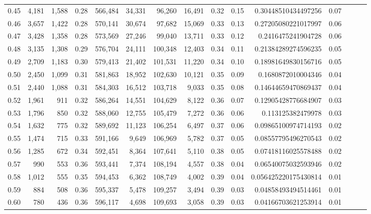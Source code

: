 \begin{tabular}{rrrrrrrrrrrrrrr}
0.45 &   4,181 &  1,588 &  0.28 &  566,484 &   34,331 &   96,260 &   16,491 &  0.32 &  0.15 &     0.30448510434497256 &      0.07 \\
0.46 &   3,657 &  1,422 &  0.28 &  570,141 &   30,674 &   97,682 &   15,069 &  0.33 &  0.13 &     0.27205080221017997 &      0.06 \\
0.47 &   3,428 &  1,358 &  0.28 &  573,569 &   27,246 &   99,040 &   13,711 &  0.33 &  0.12 &      0.2416475241904728 &      0.06 \\
0.48 &   3,135 &  1,308 &  0.29 &  576,704 &   24,111 &  100,348 &   12,403 &  0.34 &  0.11 &     0.21384289274596235 &      0.05 \\
0.49 &   2,709 &  1,183 &  0.30 &  579,413 &   21,402 &  101,531 &   11,220 &  0.34 &  0.10 &     0.18981649830156716 &      0.05 \\
0.50 &   2,450 &  1,099 &  0.31 &  581,863 &   18,952 &  102,630 &   10,121 &  0.35 &  0.09 &      0.1680872010004346 &      0.04 \\
0.51 &   2,440 &  1,088 &  0.31 &  584,303 &   16,512 &  103,718 &    9,033 &  0.35 &  0.08 &     0.14644659470869437 &      0.04 \\
0.52 &   1,961 &    911 &  0.32 &  586,264 &   14,551 &  104,629 &    8,122 &  0.36 &  0.07 &     0.12905428776684907 &      0.03 \\
0.53 &   1,796 &    850 &  0.32 &  588,060 &   12,755 &  105,479 &    7,272 &  0.36 &  0.06 &       0.113125382479978 &      0.03 \\
0.54 &   1,632 &    775 &  0.32 &  589,692 &   11,123 &  106,254 &    6,497 &  0.37 &  0.06 &     0.09865100974714193 &      0.02 \\
0.55 &   1,474 &    715 &  0.33 &  591,166 &    9,649 &  106,969 &    5,782 &  0.37 &  0.05 &     0.08557795496270543 &      0.02 \\
0.56 &   1,285 &    672 &  0.34 &  592,451 &    8,364 &  107,641 &    5,110 &  0.38 &  0.05 &     0.07418116025578488 &      0.02 \\
0.57 &     990 &    553 &  0.36 &  593,441 &    7,374 &  108,194 &    4,557 &  0.38 &  0.04 &     0.06540075032593946 &      0.02 \\
0.58 &   1,012 &    555 &  0.35 &  594,453 &    6,362 &  108,749 &    4,002 &  0.39 &  0.04 &    0.056425220175430814 &      0.01 \\
0.59 &     884 &    508 &  0.36 &  595,337 &    5,478 &  109,257 &    3,494 &  0.39 &  0.03 &     0.04858493494514461 &      0.01 \\
0.60 &     780 &    436 &  0.36 &  596,117 &    4,698 &  109,693 &    3,058 &  0.39 &  0.03 &     0.04166703621253914 &      0.01 \\

\end{tabular}
